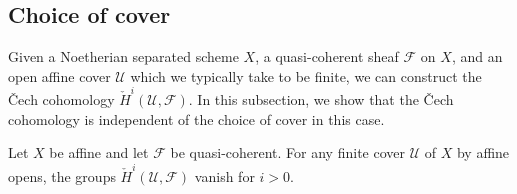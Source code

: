 \subsection{Choice of cover}
Given a Noetherian separated scheme \( X \), a quasi-coherent sheaf \( \mathcal F \) on \( X \), and an open affine cover \( \mathcal U \) which we typically take to be finite, we can construct the \v{C}ech cohomology \( \check{H}^i(\mathcal U, \mathcal F) \).
In this subsection, we show that the \v{C}ech cohomology is independent of the choice of cover in this case.
\begin{theorem}
	Let \( X \) be affine and let \( \mathcal F \) be quasi-coherent.
	For any finite cover \( \mathcal U \) of \( X \) by affine opens, the groups \( \check{H}^i(\mathcal U, \mathcal F) \) vanish for \( i > 0 \).
\end{theorem}
